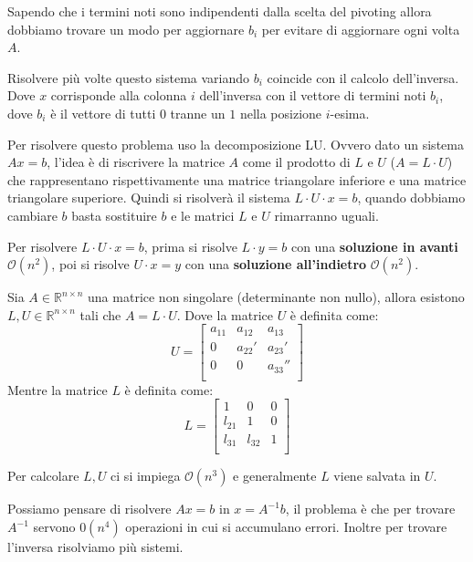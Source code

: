 Sapendo che i termini noti sono indipendenti dalla scelta del pivoting allora
dobbiamo trovare un modo per aggiornare $b_i$ per evitare di aggiornare ogni
volta $A$.
\begin{osservazione}
    Risolvere più volte questo sistema variando $b_i$ coincide con il calcolo
    dell'inversa. Dove $x$ corrisponde alla colonna $i$ dell'inversa con il
    vettore di termini noti $b_i$, dove $b_i$ è il vettore di tutti $0$ tranne
    un $1$ nella posizione $i$-esima.
\end{osservazione}
Per risolvere questo problema uso la decomposizione LU. Ovvero dato un sistema
$Ax=b$, l'idea è di riscrivere la matrice $A$ come il prodotto di $L$ e $U$ ($A
    = L \cdot U$) che rappresentano rispettivamente una matrice triangolare
inferiore e una matrice triangolare superiore. Quindi si risolverà il sistema $L
    \cdot U \cdot x = b$, quando dobbiamo cambiare $b$ basta sostituire $b$ e le
matrici $L$ e $U$ rimarranno uguali.

Per risolvere $L\cdot U \cdot x =b$, prima si risolve $L\cdot y =b$ con una
\textbf{soluzione in avanti} $\mathcal{O}(n^2)$, poi si risolve $U \cdot x = y$
con una \textbf{soluzione all'indietro} $\mathcal{O}(n^2)$.
\begin{teorema}
    Sia $A \in \mathbb{R}^{n\times n}$ una matrice non singolare (determinante
    non nullo), allora esistono $L,U \in \mathbb{R}^{n\times n}$ tali che $A =
        L \cdot U$.
    Dove la matrice $U$ è definita come:
    \begin{equation*}
        U=\left[\begin{array}{ccc}
                a_{11} & a_{12}  & a_{13}   \\
                0      & a_{22}' & a_{23}'  \\
                0      & 0       & a_{33}'' \\
            \end{array}\right]
    \end{equation*}
    Mentre la matrice $L$ è definita come:
    \begin{equation*}
        L=\left[\begin{array}{ccc}
                1      & 0       & 0       \\
                l_{21} & 1       & 0       \\
                l_{31} & l_{32}  & 1       \\
            \end{array}\right]
    \end{equation*}
\end{teorema}
Per calcolare $L,U$ ci si impiega $\mathcal{O}(n^3)$ e generalmente $L$ viene 
salvata in $U$.
\begin{nota}
    Possiamo pensare di risolvere $Ax=b$ in $x= A^{-1}b$, il problema è che per
    trovare $A^{-1}$ servono $\mathcal{0}(n^4)$ operazioni in cui si accumulano
    errori. Inoltre per trovare l'inversa risolviamo più sistemi.
\end{nota}